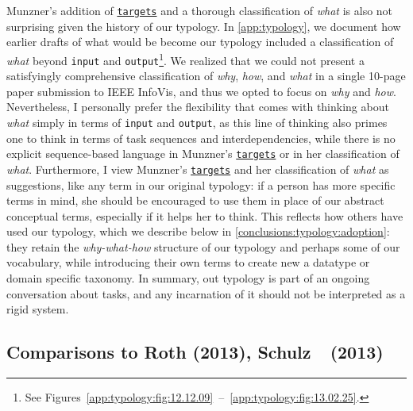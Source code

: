 Munzner's addition of \underline{{\tt targets}} and a thorough classification of {\it what} is also not surprising given the history of our typology.
In \autoref{app:typology}, we document how earlier drafts of what would be become our typology included a classification of {\it what} beyond {\tt input} and {\tt output}\footnote{See Figures~\ref{app:typology:fig:12.12.09}~--~\ref{app:typology:fig:13.02.25}.}.
We realized that we could not present a satisfyingly comprehensive classification of {\it why}, {\it how}, and {\it what} in a single 10-page paper submission to IEEE InfoVis, and thus we opted to focus on {\it why} and {\it how}.
Nevertheless, I personally prefer the flexibility that comes with thinking about {\it what} simply in terms of {\tt input} and {\tt output}, as this line of thinking also primes one to think in terms of task sequences and interdependencies, while there is no explicit sequence-based language in Munzner's \underline{{\tt targets}} or in her classification of {\it what}.
Furthermore, I view Munzner's \underline{{\tt targets}} and her classification of {\it what} as suggestions, like any term in our original typology: if a person has more specific terms in mind, she should be encouraged to use them in place of our abstract conceptual terms, especially if it helps her to think.
This reflects how others have used our typology, which we describe below in \autoref{conclusions:typology:adoption}: they retain the {\it why-what-how} structure of our typology and perhaps some of our vocabulary, while introducing their own terms to create new a datatype or domain specific taxonomy.
In summary, out typology is part of an ongoing conversation about tasks, and any incarnation of it should not be interpreted as a rigid system.


\subsection{Comparisons to Roth (2013), Schulz~\etal~(2013)}
\label{conclusions:typology:contemporary}

